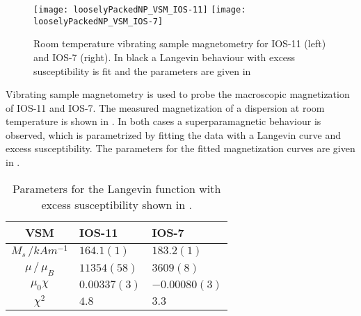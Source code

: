 \documentclass[\main/dresen_thesis.tex]{subfiles}
\begin{document}
  \label{sec:looselyPackedNS:nanoparticle:vsm}
  \begin{figure}[tb]
    \centering
    \texttt{[image: looselyPackedNP\_VSM\_IOS-11]}
    \texttt{[image: looselyPackedNP\_VSM\_IOS-7]}
    \caption{\label{fig:looselyPackedNP:nanoparticle:vsm}Room temperature vibrating sample magnetometry for IOS-11 (left) and IOS-7 (right). In black a Langevin behaviour with excess susceptibility is fit and the parameters are given in }
  \end{figure}

  Vibrating sample magnetometry is used to probe the macroscopic magnetization of IOS-11 and IOS-7.
  The measured magnetization of a dispersion at room temperature is shown in .
  In both cases a superparamagnetic behaviour is observed, which is parametrized by fitting the data with a Langevin curve and excess susceptibility.
  The parameters for the fitted magnetization curves are given in .

  \begin{table}[!htbp]
    \centering
    \caption{\label{tab:looselyPackedNP:nanoparticle:vsm}Parameters for the Langevin function with excess susceptibility shown in .}
    \begin{tabular}{ c | l | l }
      \rule{0pt}{2ex} \textbf{VSM} & IOS-11 & IOS-7 \\
      \hline
      \rule{0pt}{2ex} $M_s \, /  \unit{kAm^{-1}}$               & $164.1(1)$    & $183.2(1)$\\
      \rule{0pt}{2ex} $\mu \, / \, \mu_B$                       & $11354(58)$   & $3609(8)$\\
      \rule{0pt}{2ex} $\mu_0 \chi$                              & $0.00337(3)$  & $-0.00080(3)$\\
      \hline
      \rule{0pt}{2ex} $\chi^2$                                  & $4.8 $        & $3.3$\\
      \hline
    \end{tabular}
  \end{table}
\end{document}
